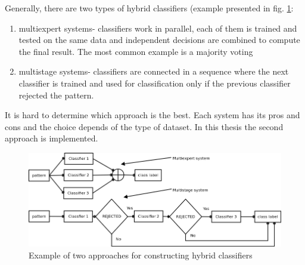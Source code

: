 Generally, there are two types of hybrid classifiers (example presented in fig.
\ref{fig:hybrid}:
\begin{enumerate}
    \item multiexpert systems- classifiers work in parallel, each of them is
        trained and tested on the same data and independent decisions are
        combined to compute the final result. The most common example is a
        majority voting 
    \item multistage systems- classifiers are connected in a sequence where the
        next classifier is trained and used for classification only if the
        previous classifier rejected the pattern. 
\end{enumerate}
It is hard to determine which approach is the best. Each system has its pros
and cons and the choice depends of the type of dataset. In this thesis the second 
approach is implemented.
\begin{figure}[H]
    \begin{center}
        \includegraphics[width=\textwidth]{fig/hybrid.png}
    \end{center}
    \caption{Example of two approaches for constructing hybrid classifiers}
    \label{fig:hybrid}
\end{figure}

